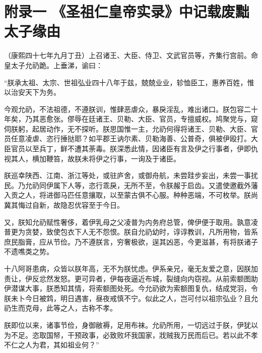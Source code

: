 \chapter*{附录一 《圣祖仁皇帝实录》中记载废黜太子缘由}

（康熙四十七年九月丁丑）上召诸王、大臣、侍卫、文武官员等，齐集行宫前。命皇太子允礽跪。上垂涕，谕曰：



“朕承太祖、太宗、世祖弘业四十八年于兹，兢兢业业，轸恤臣工，惠养百姓，惟以治安天下为务。



今观允礽，不法祖德，不遵朕训，惟肆恶虐众，暴戾淫乱，难出诸口。朕包容二十年矣，乃其恶愈张。僇辱在廷诸王、贝勒、大臣、官员，专擅威权。鸠聚党与，窥伺朕躬，起居动作，无不探听。朕思国惟一主，允礽何得将诸王、贝勒、大臣、官员任意凌虐、恣行捶挞耶？如平郡王讷尔素、贝勒海善、公普奇，俱被伊殴打。大臣官员以至兵丁，鲜不遭其荼毒。朕深悉此情，因诸臣有言及伊之行事者，伊即仇视其人，横加鞭笞，故朕未将伊之行事，一询及于诸臣。



朕巡幸陕西、江南、浙江等处，或驻庐舍，或御舟航，未尝跬步妄出，未尝一事扰民。乃允礽同伊属下人等，恣行乖戾，无所不至，令朕赧于启齿。又遣使邀截外藩入贡之人，将进御马匹任意攘取，以至蒙古俱不心服。种种恶端，不可枚举。朕尚冀其悔过自新，故隐忍优容至于今日。



又，朕知允礽赋性奢侈，着伊乳母之父凌普为内务府总管，俾伊便于取用。孰意凌普更为贪婪，致使包衣下人无不怨恨。朕自允礽幼时，谆谆教训，凡所用物，皆系庶民脂膏，应从节俭。乃不遵朕言，穷奢极欲，逞其凶恶，今更滋甚，有将朕诸子不遗噍类之势。



十八阿哥患病，众皆以朕年高，无不为朕忧虑。伊系亲兄，毫无友爱之意，因朕加责让，伊反忿然发怒。更可异者，伊每夜逼近布城，裂缝向内窃视。从前索额图助伊潜谋大事，朕悉知其情，将索额图处死。今允礽欲为索额图复仇，结成党羽，令朕未卜今日被鸩，明日遇害，昼夜戒慎不宁。似此之人，岂可付以祖宗弘业？且允礽生而克母，此等之人，古称不孝。



朕即位以来，诸事节俭，身御敝褥，足用布袜。允礽所用，一切远过于朕，伊犹以为不足。恣取国帑，干预政事，必致败坏我国家，戕贼我万民而后已。若以此不孝不仁之人为君，其如祖业何？”


